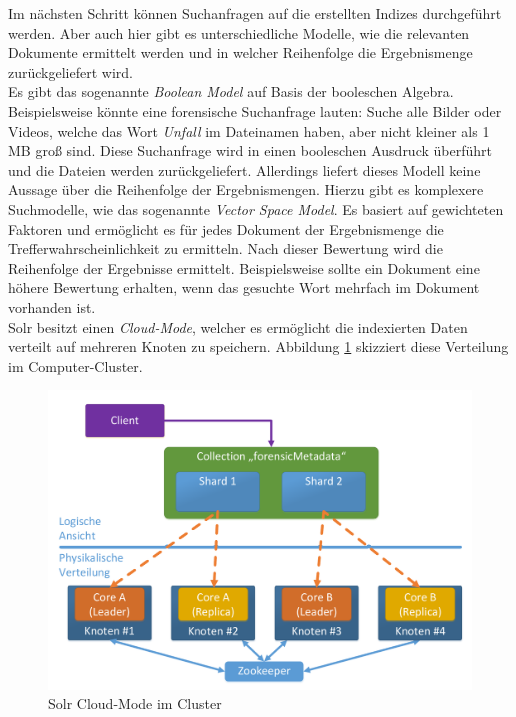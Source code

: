 \noindent
Im nächsten Schritt können Suchanfragen auf die erstellten Indizes durchgeführt werden. Aber auch hier gibt es unterschiedliche Modelle, wie die relevanten Dokumente ermittelt werden und in welcher Reihenfolge die Ergebnismenge zurückgeliefert wird.\\
Es gibt das sogenannte \textit{Boolean Model} auf Basis der booleschen Algebra. Beispielsweise könnte eine forensische Suchanfrage lauten: Suche alle Bilder oder Videos, welche das Wort \textit{Unfall} im Dateinamen haben, aber nicht kleiner als 1 MB groß sind. Diese Suchanfrage wird in einen booleschen Ausdruck überführt und die Dateien werden zurückgeliefert. Allerdings liefert dieses Modell keine Aussage über die Reihenfolge der Ergebnismengen. Hierzu gibt es komplexere Suchmodelle, wie das sogenannte \textit{Vector Space Model}. Es basiert auf gewichteten Faktoren und ermöglicht es für jedes Dokument der Ergebnismenge die Trefferwahrscheinlichkeit zu ermitteln. Nach dieser Bewertung wird die Reihenfolge der Ergebnisse ermittelt. Beispielsweise sollte ein Dokument eine höhere Bewertung erhalten, wenn das gesuchte Wort mehrfach im Dokument vorhanden ist.\cite[S. 47 ff]{solr_search}\\

\noindent
Solr besitzt einen \textit{Cloud-Mode}, welcher es ermöglicht die indexierten Daten verteilt auf mehreren Knoten zu speichern. Abbildung \ref{fig:solr_cluster_architecture} skizziert diese Verteilung im Computer-Cluster.\\

\begin{figure}[ht]
  \centering
  \includegraphics[width=\textwidth]{./resource/solr_cluster_architecture.pdf}
  \caption{Solr Cloud-Mode im Cluster}
  \label{fig:solr_cluster_architecture}
\end{figure}


